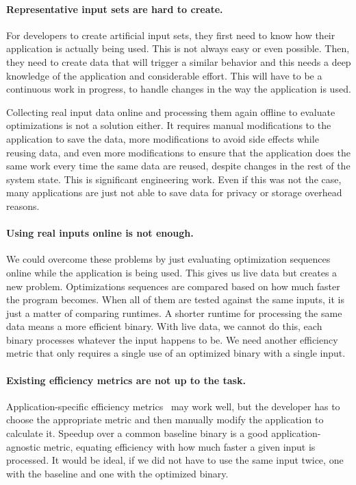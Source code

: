     \paragraph{Representative input sets are hard to create.} For developers to create artificial input sets, they first need to know how
    their application is actually being used. This is not always easy or even possible. Then, they need to create data that will trigger a
    similar behavior and this needs a deep knowledge of the application and considerable effort. This will have to be a continuous work in
    progress, to handle changes in the way the application is used.

    Collecting real input data online and processing them again offline to evaluate optimizations is not a solution either. It requires
    manual modifications to the application to save the data, more modifications to avoid side effects while reusing data, and even more
    modifications to ensure that the application does the same work every time the same data are reused, despite changes in the rest of
    the system state. This is significant engineering work. Even if this was not the case, many applications are just not able to save
    data for privacy or storage overhead reasons.
    
    \paragraph{Using real inputs online is not enough.} We could overcome these problems by just evaluating optimization sequences online
    while the application is being used. This gives us live data but creates a new problem. Optimizations sequences are compared based on
    how much faster the program becomes. When all of them are tested against the same inputs, it is just a matter of comparing runtimes.
    A shorter runtime for processing the same data means a more efficient binary. With live data, we cannot do this, each binary processes
    whatever the input happens to be. We need another efficiency metric that only requires a single use of an optimized binary with a
    single input.

    \paragraph{Existing efficiency metrics are not up to the task.} Application-specific efficiency metrics~\cite{alameldeen06,coppa14} may
    work well, but the developer has to choose the appropriate metric and then manually modify the application to calculate it. Speedup
    over a common baseline binary is a good application-agnostic metric, equating efficiency with how much faster a given input is
    processed. It would be ideal, if we did not have to use the same input twice, one with the baseline and one with the optimized binary.
    
